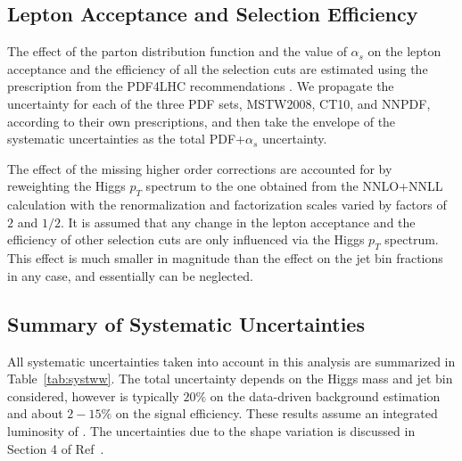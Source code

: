 \subsection{Lepton Acceptance and Selection Efficiency }

The effect of the parton distribution function and the value of $\alpha_{s}$
 on the lepton acceptance and the efficiency of all the selection cuts are 
estimated using the prescription from the PDF4LHC recommendations \cite{PDF4LHC}. We 
propagate the uncertainty for each of the three PDF sets, MSTW2008, CT10, and
NNPDF, according to their own prescriptions, and then take the envelope
of the systematic uncertainties as the total PDF+$\alpha_{s}$  uncertainty. 

The effect of the missing higher order corrections are accounted for by
reweighting the Higgs $p_{T}$ spectrum to the one obtained from the
NNLO+NNLL calculation with the renormalization and factorization scales
varied by factors of $2$ and $1/2$. It is assumed that any change in the
lepton acceptance and the efficiency of other selection cuts are only
influenced via the Higgs $p_{T}$ spectrum. This effect is much smaller in 
magnitude than the effect on the jet bin fractions in any case, and 
essentially can be neglected.



\subsection{Summary of Systematic Uncertainties}

All systematic uncertainties taken into account in this analysis
are summarized in Table~\ref{tab:systww}.
The total uncertainty depends on the Higgs mass and jet bin considered,
however is typically $20\%$ on the data-driven background estimation and about $2-15\%$ 
on the signal efficiency. These results assume an integrated luminosity of \intlumi. 
The uncertainties due to the shape variation is discussed in Section 4 of Ref~\cite{shapeananote}. 

